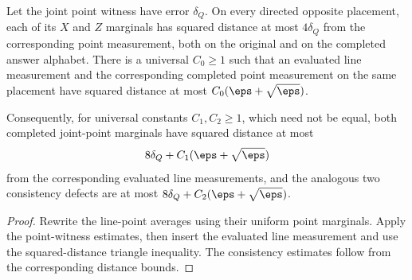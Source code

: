 \begin{lemma}
	\label{lem:qld-point-line-marginal-bounds}
	\leanok
	Let the joint point witness have error $\delta_Q$. On every directed
	opposite placement, each of its $X$ and $Z$ marginals has squared distance
	at most $4\delta_Q$ from the corresponding point measurement, both on the
	original and on the completed answer alphabet. There is a universal
	$C_0\geq1$ such that an evaluated line measurement and the corresponding
	completed point measurement on the same placement have squared distance at
	most $C_0(\eps+\sqrt\eps)$.

	Consequently, for universal constants $C_1,C_2\geq1$, which need not be
	equal, both completed joint-point marginals have squared distance at most
	\[
		8\delta_Q+C_1(\eps+\sqrt\eps)
	\]
	from the corresponding evaluated line measurements, and the analogous two
	consistency defects are at most
	$8\delta_Q+C_2(\eps+\sqrt\eps)$.
\end{lemma}
\begin{proof}
	\leanok
	Rewrite the line-point averages using their uniform point marginals. Apply
	the point-witness estimates, then insert the evaluated line measurement and
	use the squared-distance triangle inequality. The consistency estimates
	follow from the corresponding distance bounds.
\end{proof}

